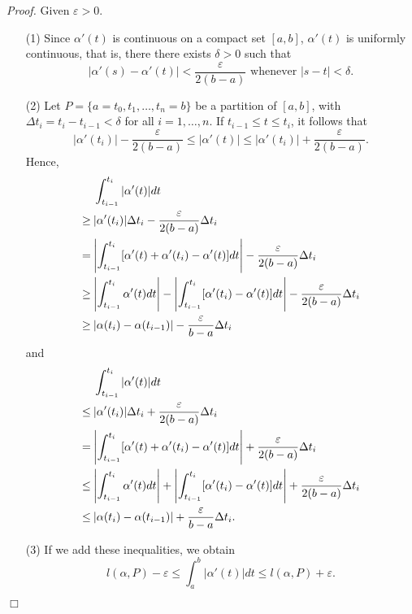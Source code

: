 \documentclass{article}
\begin{document}
\emph{Proof.}
Given $\varepsilon > 0$.
\begin{enumerate}
\item[(1)]
  Since $\alpha'(t)$ is continuous on a compact set $[a,b]$,
  $\alpha'(t)$ is uniformly continuous, that is,
  there there exists $\delta > 0$ such that
  \[
    |\alpha'(s) - \alpha'(t)| < \frac{\varepsilon}{2(b-a)}
    \text{ whenever } |s-t| < \delta.
  \]
\item[(2)]
  Let $P = \{a = t_0, t_1, \ldots, t_n = b \}$
  be a partition of $[a,b]$, with $\Delta t_i = t_i - t_{i-1} < \delta$
  for all $i = 1, \ldots, n$.
  If $t_{i-1} \leq t \leq t_i$, it follows that
  \[
    |\alpha'(t_i)| - \frac{\varepsilon}{2(b-a)}
    \leq |\alpha'(t)|
    \leq |\alpha'(t_i)| + \frac{\varepsilon}{2(b-a)}.
  \]
  Hence,
  \begin{align*}
    & \: \int_{t_{i-1}}^{t_i} |\alpha'(t)| dt \\
    \geq& \: |\alpha'(t_i)| \Delta t_i
      - \frac{\varepsilon}{2(b-a)} \Delta t_i \\
    =& \: \abs{ \int_{t_{i-1}}^{t_i} [\alpha'(t)+\alpha'(t_i)-\alpha'(t)] dt }
      - \frac{\varepsilon}{2(b-a)} \Delta t_i \\
    \geq& \: \abs{ \int_{t_{i-1}}^{t_i} \alpha'(t) dt }
      - \abs{ \int_{t_{i-1}}^{t_i} [\alpha'(t_i)-\alpha'(t)] dt }
      - \frac{\varepsilon}{2(b-a)} \Delta t_i \\
    \geq& \: \abs{ \alpha(t_i) - \alpha(t_{i-1}) }
      - \frac{\varepsilon}{b-a} \Delta t_i
  \end{align*}
  and
  \begin{align*}
    & \: \int_{t_{i-1}}^{t_i} |\alpha'(t)| dt \\
    \leq& \: |\alpha'(t_i)| \Delta t_i
      + \frac{\varepsilon}{2(b-a)} \Delta t_i \\
    =& \: \abs{ \int_{t_{i-1}}^{t_i} [\alpha'(t)+\alpha'(t_i)-\alpha'(t)] dt }
      + \frac{\varepsilon}{2(b-a)} \Delta t_i \\
    \leq& \: \abs{ \int_{t_{i-1}}^{t_i} \alpha'(t) dt }
      + \abs{ \int_{t_{i-1}}^{t_i} [\alpha'(t_i)-\alpha'(t)] dt }
      + \frac{\varepsilon}{2(b-a)} \Delta t_i \\
    \leq& \: \abs{ \alpha(t_i) - \alpha(t_{i-1}) }
      + \frac{\varepsilon}{b-a} \Delta t_i.
  \end{align*}

\item[(3)]
  If we add these inequalities, we obtain
  \[
    l(\alpha,P) - \varepsilon
    \leq \int_{a}^{b} |\alpha'(t)| dt
    \leq l(\alpha,P) + \varepsilon.
  \]
\end{enumerate}
$\Box$ \\\\
\end{document}
